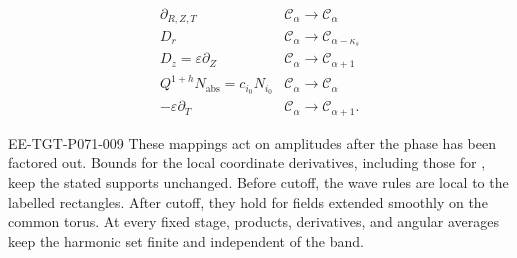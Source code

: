 \begin{proposition}
\begin{equation}
\begin{array}{c|c}
    \partial_{R,Z,T}&\mathcal C_\alpha\longrightarrow \mathcal C_\alpha\\
    D_r&\mathcal C_\alpha\longrightarrow \mathcal C_{\alpha-\kappa_s}\\
    D_z=\varepsilon\partial_Z&\mathcal C_\alpha\longrightarrow \mathcal C_{\alpha+1}\\
    Q^{1+h}N_{\mathrm{abs}}=c_{i_0}N_{i_0}
      &\mathcal C_\alpha\longrightarrow \mathcal C_\alpha\\
    -\varepsilon\partial_T&\mathcal C_\alpha\longrightarrow \mathcal C_{\alpha+1}.
  \end{array}
  \tag{6.32}\label{eq:6.32}
\end{equation}
\begin{EESegment}{EE-TGT-P071-009}
These mappings act on amplitudes after the phase has been factored out. Bounds for the local coordinate derivatives, including those for , keep the stated supports unchanged. Before cutoff, the wave rules are local to the labelled rectangles. After cutoff, they hold for fields extended smoothly on the common torus. At every fixed stage, products, derivatives, and angular averages keep the harmonic set finite and independent of the band.
\end{EESegment}
\end{proposition}

